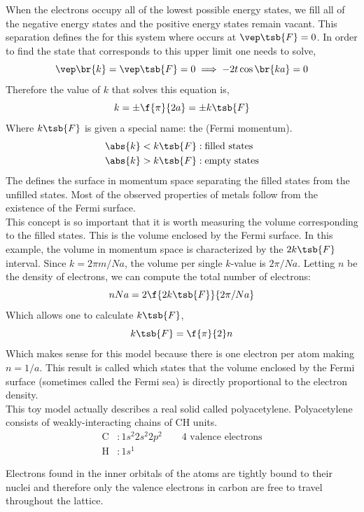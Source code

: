 \documentclass{article}
\begin{document}
When the electrons occupy all of the lowest possible energy states, we fill all of the negative energy states and the positive energy states remain vacant. This separation defines the  for this system where occurs at $\vep\tsb{F} = 0$. In order to find the state that corresponds to this upper limit one needs to solve,
\[ \vep\br{k} = \vep\tsb{F} = 0 \implies -2t \cos\br{ka} = 0 \]
Therefore the value of $k$ that solves this equation is,
\[  k = \pm \f{\pi}{2a} = \pm k\tsb{F}\]
Where $k\tsb{F}$ is given a special name: the  (Fermi momentum).
\begin{align*}
    \abs{k} < k\tsb{F} &: \text{filled states}\\
    \abs{k} > k\tsb{F} &: \text{empty states}
\end{align*}
The  defines the surface in momentum space separating the filled states from the unfilled states. Most of the observed properties of metals follow from the existence of the Fermi surface. \\

This concept is so important that it is worth measuring the volume  corresponding to the filled states. This is the volume enclosed by the Fermi surface. In this example, the volume in momentum space is characterized by the $2 k\tsb{F}$ interval. Since $k = 2\pi m / Na$, the volume per single $k$-value is $2 \pi / Na$. Letting $n$ be the density of electrons, we can compute the total number of electrons:
\[ n N a = 2 \f{2k\tsb{F}}{2 \pi / Na} \]
Which allows one to calculate $k\tsb{F}$,
\[ k\tsb{F} =\f{\pi}{2} n \]
Which makes sense for this model because there is one electron per atom making $n = 1/a$.
This result is called  which states that the volume enclosed by the Fermi surface (sometimes called the Fermi sea) is directly proportional to the electron density. \\

This toy model actually describes a real solid called polyacetylene. Polyacetylene consists of weakly-interacting chains of CH units.
\begin{align*}
    \text{C} &: 1s^2 2s^2 2p^2 \qquad \text{4 valence electrons}\\
    \text{H} &: 1s^1
\end{align*}

Electrons found in the inner orbitals of the atoms are tightly bound to their nuclei and therefore only the valence electrons in carbon are free to travel throughout the lattice.
\end{document}
